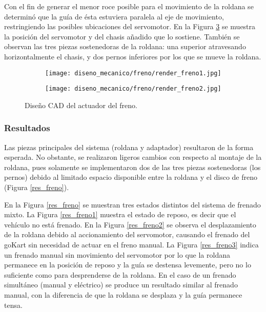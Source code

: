 Con el fin de generar el menor roce posible para el movimiento de la roldana se determinó que la guía de ésta estuviera paralela al eje de movimiento, restringiendo las posibles ubicaciones del servomotor. En la Figura \ref{cad_freno} se muestra la posición del servomotor y del chasis añadido que lo sostiene. También se observan las tres piezas sostenedoras de la roldana: una superior atravesando horizontalmente el chasis, y dos pernos inferiores por los que se mueve la roldana.

\begin{figure}[H]
\begin{center}
    \begin{subfigure}{0.4\textwidth}
        \texttt{[image: diseno\_mecanico/freno/render\_freno1.jpg]} 
        \label{freno1}
    \end{subfigure}
    \begin{subfigure}{0.4\textwidth}
        \texttt{[image: diseno\_mecanico/freno/render\_freno2.jpg]}
        \label{freno2}
    \end{subfigure}
    \caption{Diseño CAD del actuador del freno.}
    \label{cad_freno}
\end{center}
\end{figure}


\subsubsection{Resultados}

Las piezas principales del sistema (roldana y adaptador) resultaron de la forma esperada. No obstante, se realizaron ligeros cambios con respecto al montaje de la roldana, pues solamente se implementaron dos de las tres piezas sostenedoras (los pernos) debido al limitado espacio disponible entre la roldana y el disco de freno (Figura \ref{res_freno}).

En la Figura \ref{res_freno} se muestran tres estados distintos del sistema de frenado mixto. La Figura \ref{res_freno1} muestra el estado de reposo, es decir que el vehículo no está frenado. En la Figura \ref{res_freno2} se observa el desplazamiento de la roldana debido al accionamiento del servomotor, causando el frenado del goKart sin necesidad de actuar en el freno manual. La Figura \ref{res_freno3} indica un frenado manual sin movimiento del servomotor por lo que la roldana permanece en la posición de reposo y la guía se destensa levemente, pero no lo suficiente como para desprenderse de la roldana. En el caso de un frenado simultáneo (manual y eléctrico) se produce un resultado similar al frenado manual, con la diferencia de que la roldana se desplaza y la guía permanece tensa.



